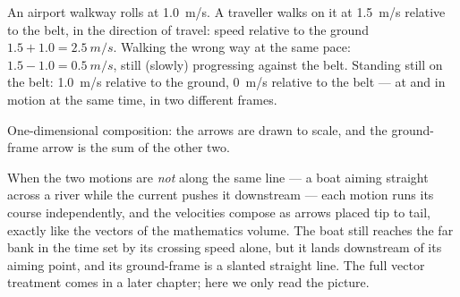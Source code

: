 \begin{example}\label{ex:g10:relative-motion:walkway}
An airport walkway rolls at \qty{1.0}{m/s}. A traveller walks on it at
\qty{1.5}{m/s} relative to the belt, in the direction of travel: speed
relative to the ground $1.5 + 1.0 = \qty{2.5}{m/s}$. Walking the wrong
way at the same pace: $1.5 - 1.0 = \qty{0.5}{m/s}$, still (slowly)
progressing against the belt. Standing still on the belt:
\qty{1.0}{m/s} relative to the ground, \qty{0}{m/s} relative to the
belt --- at  and in motion at the same time, in two different
frames.
\end{example}

\begin{omfigure}

{\small One-dimensional composition: the arrows are drawn to scale, and
the ground-frame arrow is the sum of the other two.}
\end{omfigure}

\begin{remark}\label{rem:g10:relative-motion:twodim}
When the two motions are \emph{not} along the same line --- a boat aiming
straight across a river while the current pushes it downstream --- each
motion runs its course independently, and the velocities compose as
arrows placed tip to tail, exactly like the vectors of the mathematics
volume. The boat still reaches the far bank in the time set by its
crossing speed alone, but it lands downstream of its aiming point, and
its ground-frame  is a slanted straight line. The full vector
treatment comes in a later chapter; here we only read the picture.
\end{remark}

